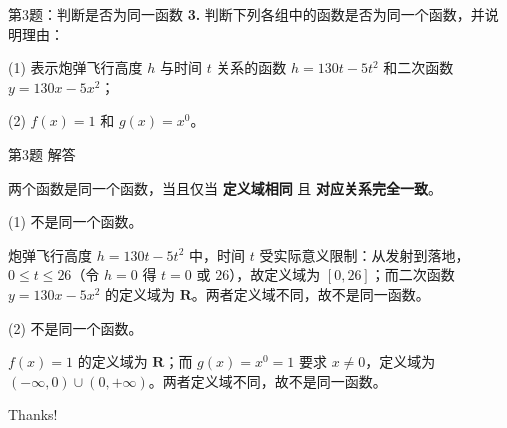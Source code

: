\documentclass[10pt,aspectratio=169,serif]{beamer}
\begin{document}
\begin{frame}[t]{第3题：判断是否为同一函数}
\textbf{3.} 判断下列各组中的函数是否为同一个函数，并说明理由：

\vspace{1em}
(1) 表示炮弹飞行高度 $h$ 与时间 $t$ 关系的函数 $h=130t-5t^2$ 和二次函数 $y=130x-5x^2$；

\vspace{1em}
(2) $f(x)=1$ 和 $g(x)=x^0$。
\end{frame}

\begin{frame}[t]{第3题 解答}
\begin{tcolorbox}[colback=orange!10,colframe=orange,title=\textbf{解}]
两个函数是同一个函数，当且仅当 \textbf{定义域相同} 且 \textbf{对应关系完全一致}。

\vspace{0.5em}
(1) \alert{不是}同一个函数。

炮弹飞行高度 $h=130t-5t^2$ 中，时间 $t$ 受实际意义限制：从发射到落地，$0 \le t \le 26$（令 $h=0$ 得 $t=0$ 或 $26$），故定义域为 $[0,26]$；而二次函数 $y=130x-5x^2$ 的定义域为 $\mathbf{R}$。两者定义域不同，故不是同一函数。

\vspace{0.5em}
(2) \alert{不是}同一个函数。

$f(x)=1$ 的定义域为 $\mathbf{R}$；而 $g(x)=x^0=1$ 要求 $x\neq 0$，定义域为 $(-\infty,0)\cup(0,+\infty)$。两者定义域不同，故不是同一函数。
\end{tcolorbox}
\end{frame}

\begin{frame}[c]
  \begin{center}
    {\Huge\calligra Thanks!}
  \end{center}
\end{frame}
\end{document}

